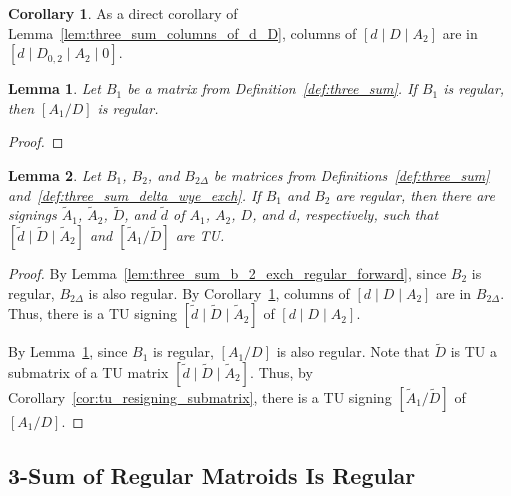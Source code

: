 \documentclass{article}
\newtheorem{lemma}{Lemma}
\theoremstyle{definition}
\newtheorem{corollary}{Corollary}
\begin{document}
\begin{corollary}\label{cor:three_sum_columns_of_b_2_delta}
    As a direct corollary of Lemma~\ref{lem:three_sum_columns_of_d_D}, columns of $[d \mid D \mid A_{2}]$ are in $[d \mid D_{0, 2} \mid A_{2} \mid 0]$.
\end{corollary}

\begin{lemma}\label{lem:three_sum_A_1_D_regular}
    Let $B_{1}$ be a matrix from Definition~\ref{def:three_sum}. If $B_{1}$ is regular, then $[A_{1} / D]$ is regular.
\end{lemma}

\begin{proof}
\end{proof}

\begin{lemma}
    Let $B_{1}$, $B_{2}$, and $B_{2 \Delta}$ be matrices from Definitions~\ref{def:three_sum} and~\ref{def:three_sum_delta_wye_exch}. If $B_{1}$ and $B_{2}$ are regular, then there are signings $\tilde{A}_{1}$, $\tilde{A}_{2}$, $\tilde{D}$, and $\tilde{d}$ of $A_{1}$, $A_{2}$, $D$, and $d$, respectively, such that $[\tilde{d} \mid \tilde{D} \mid \tilde{A}_{2}]$ and $[\tilde{A}_{1} / \tilde{D}]$ are TU.
\end{lemma}

\begin{proof}
    By Lemma~\ref{lem:three_sum_b_2_exch_regular_forward}, since $B_{2}$ is regular, $B_{2 \Delta}$ is also regular. By Corollary~\ref{cor:three_sum_columns_of_b_2_delta}, columns of $[d \mid D \mid A_{2}]$ are in $B_{2 \Delta}$. Thus, there is a TU signing $[\tilde{d} \mid \tilde{D} \mid \tilde{A}_{2}]$ of $[d \mid D \mid A_{2}]$.

    By Lemma~\ref{lem:three_sum_A_1_D_regular}, since $B_{1}$ is regular, $[A_{1} / D]$ is also regular. Note that $\tilde{D}$ is TU a submatrix of a TU matrix $[\tilde{d} \mid \tilde{D} \mid \tilde{A}_{2}]$. Thus, by Corollary~\ref{cor:tu_resigning_submatrix}, there is a TU signing $[\tilde{A}_{1} / \tilde{D}]$ of $[A_{1} / D]$. 
\end{proof}


\subsection{3-Sum of Regular Matroids Is Regular}
\end{document}
